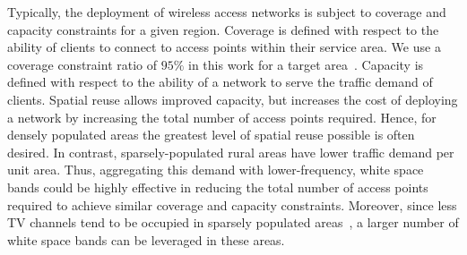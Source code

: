 Typically, the deployment of wireless access networks is subject to coverage and capacity
constraints for a given region. Coverage is defined with respect to the ability of
clients to connect to access points within their service area.  We use a coverage
constraint ratio of $95\%$ in this work for a target area~\cite{robinson2010deploying}.
Capacity is defined with respect to the ability of a network to serve the traffic 
demand of clients.  Spatial reuse allows improved capacity, but increases the cost
of deploying a network by increasing the total number of access points required.
Hence, for densely populated areas the greatest level of spatial reuse possible
is often desired.  In contrast, sparsely-populated rural areas have lower traffic
demand per unit area.  Thus, aggregating this demand with lower-frequency, white 
space bands could be highly effective in reducing the total number of access points 
required to achieve similar coverage and capacity constraints.  Moreover, since
less TV channels tend to be occupied in sparsely populated areas~\cite{msdatabase}, 
a larger number of white space bands can be leveraged in these areas.





